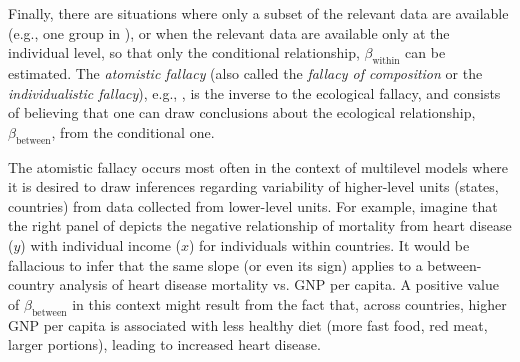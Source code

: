 Finally, there are situations where only a subset of the relevant data are available (e.g.,
one group in ), or when the relevant data are available only
at the individual level,
so that only the conditional relationship,
$\beta_{\textrm{within}}$ can be estimated. The \emph{atomistic fallacy}
(also called the \emph{fallacy of composition} or the
\emph{individualistic fallacy}), e.g., \citet{Alker:1969,Riley:1963},
is the inverse to the
ecological fallacy, and consists of believing that one can draw conclusions
about the ecological relationship, $\beta_{\textrm{between}}$, from the conditional one.

The atomistic fallacy occurs most often in the context of multilevel models \citep{Diez-Roux:1998}
where it is desired to draw inferences regarding variability of higher-level units
(states, countries) from data collected from lower-level units.
For example, imagine that the right panel of  depicts the negative
relationship of mortality from heart disease ($y$) with individual income ($x$) for
individuals within countries. It would be fallacious to infer that the same slope
(or even its sign) applies to a between-country analysis of heart disease mortality vs.
GNP per capita. A positive value of $\beta_{\textrm{between}}$ in this context might
result from the fact that, across countries, higher GNP per capita is associated with
less healthy diet (more fast food, red meat, larger portions), leading to increased heart disease.

